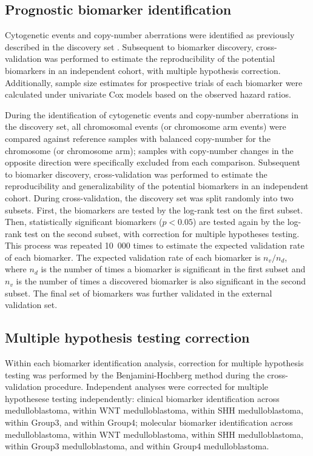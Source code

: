 \subsection{Prognostic biomarker identification}

Cytogenetic events and copy-number aberrations were identified as previously described in the discovery set . Subsequent to biomarker discovery, cross-validation was performed to estimate the reproducibility of the potential biomarkers in an independent cohort, with multiple hypothesis correction. Additionally, sample size estimates for prospective trials of each biomarker were calculated under univariate Cox models based on the observed hazard ratios.

During the identification of cytogenetic events and copy-number aberrations in the discovery set, all chromosomal events (or chromosome arm events) were compared against reference samples with balanced copy-number for the chromosome (or chromosome arm); samples with copy-number changes in the opposite direction were specifically excluded from each comparison. Subsequent to biomarker discovery, cross-validation was performed to estimate the reproducibility and generalizability of the potential biomarkers in an independent cohort. During cross-validation, the discovery set was split randomly into two subsets. First, the biomarkers are tested by the log-rank test on the first subset. Then, statistically significant biomarkers ($p < 0.05$) are tested again by the log-rank test on the second subset, with correction for multiple hypotheses testing. This process was repeated 10~000 times to estimate the expected validation rate of each biomarker. The expected validation rate of each biomarker is $n_v / n_d$, where $n_d$ is the number of times a biomarker is significant in the first subset and $n_v$ is the number of times a discovered biomarker is also significant in the second subset. The final set of biomarkers was further validated in the external validation set.

\subsection{Multiple hypothesis testing correction}

Within each biomarker identification analysis, correction for multiple hypothesis testing was performed by the Benjamini-Hochberg method during the cross-validation procedure. Independent analyses were corrected for multiple hypothesese testing independently: clinical biomarker identification across medulloblastoma, within WNT medulloblastoma, within SHH medulloblastoma, within Group3, and within Group4; molecular biomarker identification across medulloblastoma, within WNT medulloblastoma, within SHH medulloblastoma, within Group3 medulloblastoma, and within Group4 medulloblastoma.

